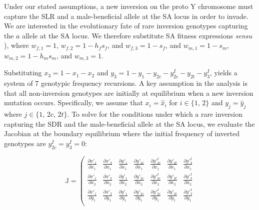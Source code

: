 \documentclass{article}
\begin{document}
\begin{appendices}
Under our stated assumptions, a new inversion on the proto Y chromosome must capture the SLR and a male-beneficial allele at the SA locus in order to invade.  We are interested in the evolutionary fate of rare inversion genotypes capturing the $a$ allele at the SA locus. We therefore substitute SA fitness expressions {\itshape sensu} \citealt{Kidwell1977,ConnallonClark2012,Otto2011}), where $w_{f,1} = 1$, $w_{f,2} = 1 - h_f s_f$, and $w_{f,3} = 1 - s_f$, and $w_{m,1} = 1 - s_m$, $w_{m,2} = 1 - h_m s_m$, and $w_{m,3} = 1$.

Substituting $x_3 = 1 - x_1 - x_2$ and $y_3 = 1 - y_1 - y_{2c} - y^I_{2c} - y_{2t} - y^I_3$, yields a system of $7$ genotypic frequency recursions. A key assumption in the analysis is that all non-inversion genotypes are initially at equilibrium when a new inversion mutation occurs. Specifically, we assume that $x_i = \hat{x}_i$ for $i \in \{1,\,2 \}$ and $y_j = \hat{y}_j$ where $j \in \{ 1,\,2c,\,2t \}$. To solve for the conditions under which a rare inversion capturing the SDR and the male-beneficial allele at the SA locus, we evaluate the Jacobian at the boundary equilibrium where the initial frequency of inverted genotypes are $y^{I}_{2c} = y^{I}_{3} = 0$:

\begin{equation*}
	\mathbb{J} = \left( \begin{array}{ccccccc}

					\frac{\partial x'_1}{\partial x_1} &
					\frac{\partial x'_2}{\partial x_1} &
					\frac{\partial y'_1}{\partial x_{1}} &
					\frac{\partial y'_{2c}}{\partial x_1} &
					\frac{\partial y'^I_{2c}}{\partial x_1} &
					\frac{\partial y'_{2t}}{\partial x_1} &
					\frac{\partial y'^I_{3}}{\partial x_1} \\[1ex]

					\frac{\partial x'_1}{\partial x_2} &
					\frac{\partial x'_2}{\partial x_2} &
					\frac{\partial y'_1}{\partial x_{2}} &
					\frac{\partial y'_{2c}}{\partial x_2} &
					\frac{\partial y'^I_{2c}}{\partial x_2} &
					\frac{\partial y'_{2t}}{\partial x_2} &
					\frac{\partial y'^I_{3}}{\partial x_2} \\[1ex]

					\frac{\partial x'_1}{\partial y_1} &
					\frac{\partial x'_2}{\partial y_1} &
					\frac{\partial y'_1}{\partial y_{1}} &
					\frac{\partial y'_{2c}}{\partial y_1} &
					\frac{\partial y'^I_{2c}}{\partial y_1} &
					\frac{\partial y'_{2t}}{\partial y_1} &
					\frac{\partial y'^I_{3}}{\partial y_1} \\[1ex]


\end{array}
\end{equation*}
\end{appendices}
\end{document}
